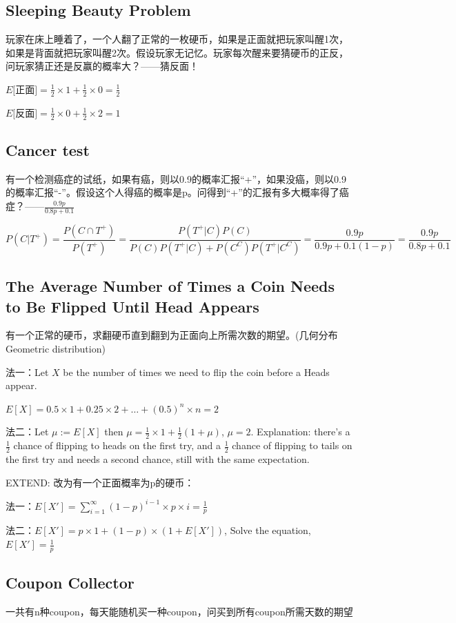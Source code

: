 \documentclass[12pt,a4paper]{ctexrep}
\begin{document}
\subsection{Sleeping Beauty Problem}
玩家在床上睡着了，一个人翻了正常的一枚硬币，如果是正面就把玩家叫醒1次，如果是背面就把玩家叫醒2次。假设玩家无记忆。玩家每次醒来要猜硬币的正反，问玩家猜正还是反赢的概率大？——猜反面！

$E[$正面$] = \frac{1}{2}\times 1 + \frac{1}{2}\times 0 = \frac{1}{2}$

$E[$反面$] = \frac{1}{2}\times 0 + \frac{1}{2}\times 2 = 1$
\subsection{Cancer test}
有一个检测癌症的试纸，如果有癌，则以0.9的概率汇报“+”，如果没癌，则以0.9的概率汇报“-”。假设这个人得癌的概率是p。问得到“+”的汇报有多大概率得了癌症？——$\frac{0.9p}{0.8p+0.1}$

\[P(C|T^+) = \frac{P(C\cap T^+)}{P(T^+)} = \frac{P(T^+|C)P(C)}{P(C)P(T^+|C)+P(C^C)P(T^+|C^C)} = \frac{0.9p}{0.9p+0.1(1-p)} = \frac{0.9p}{0.8p+0.1}\]

\subsection{The Average Number of Times a Coin Needs to Be Flipped Until Head Appears}
有一个正常的硬币，求翻硬币直到翻到为正面向上所需次数的期望。(几何分布Geometric distribution)

法一：Let $X$ be the number of times we need to flip the coin before a Heads appear.

$E[X] = 0.5\times 1 + 0.25\times 2 + \dots + (0.5)^n \times n = 2$

法二：Let $\mu := E[X]$ then $\mu = \frac{1}{2}\times 1 + \frac{1}{2}(1+\mu)$, $\mu = 2$. Explanation: there's a $\frac{1}{2}$ chance of flipping to heads on the first try, and a $\frac{1}{2}$ chance of flipping to tails on the first try and needs a second chance, still with the same expectation.

EXTEND: 改为有一个正面概率为p的硬币：

法一：$E[X'] = \sum_{i=1}^{\infty} (1-p)^{i-1} \times p \times i = \frac{1}{p}$

法二：$E[X'] = p \times 1 + (1-p) \times (1+E[X'])$, Solve the equation, $E[X'] = \frac{1}{p}$

\subsection{Coupon Collector}
一共有n种coupon，每天能随机买一种coupon，问买到所有coupon所需天数的期望
\end{document}
